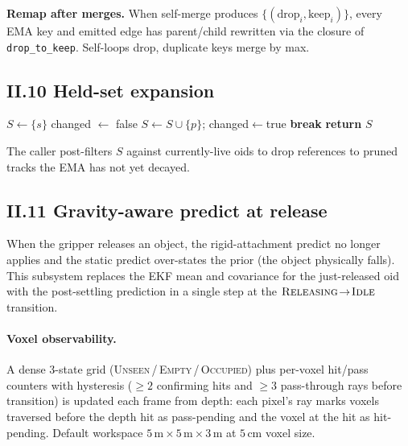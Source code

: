 \documentclass[11pt]{article}
\begin{document}
\textbf{Remap after merges.} When self-merge produces
$\{(\text{drop}_i,\text{keep}_i)\}$, every EMA key and emitted edge has
parent/child rewritten via the closure of \texttt{drop\_to\_keep}.
Self-loops drop, duplicate keys merge by max.

\subsection*{II.10 Held-set expansion}\label{sec:held}

\begin{algorithm}[H]
\begin{algorithmic}[1]
\State $S \gets \{s\}$
  \State changed $\gets$ false
     $S \gets S\cup\{p\}$; changed$\gets$true \EndIf
  \EndFor
   \textbf{break} \EndIf
\EndFor
\State \textbf{return} $S$
\end{algorithmic}
\end{algorithm}
The caller post-filters $S$ against currently-live oids to drop references
to pruned tracks the EMA has not yet decayed.

\subsection*{II.11 Gravity-aware predict at release}\label{sec:gravity}

When the gripper releases an object, the rigid-attachment predict no longer
applies and the static predict over-states the prior (the object physically
falls). This subsystem replaces the EKF mean and covariance for the
just-released oid with the post-settling prediction in a single step at the
$\textsc{Releasing}\!\to\!\textsc{Idle}$ transition.

\paragraph{Voxel observability.}
A dense 3-state grid (\textsc{Unseen}\,/\,\textsc{Empty}\,/\,\textsc{Occupied})
plus per-voxel hit/pass counters with hysteresis ($\ge\!2$ confirming hits
and $\ge\!3$ pass-through rays before transition) is updated each frame
from depth: each pixel's ray marks voxels traversed before the depth hit
as pass-pending and the voxel at the hit as hit-pending. Default workspace
$5\,\text{m}\times 5\,\text{m}\times 3\,\text{m}$ at $5\,\text{cm}$ voxel
size.
\end{document}
